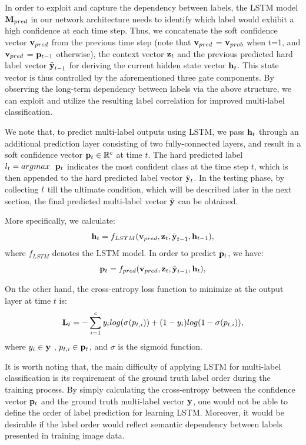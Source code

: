 \documentclass[letterpaper]{article} %
\begin{document}
In order to exploit and capture the dependency between labels, the LSTM model $\mathbf{M}_{pred}$ in our network architecture needs to identify which label would exhibit a high confidence at each time step. Thus, we concatenate the soft confidence vector $\mathbf{v}_{pred}$ from the previous time step (note that $\mathbf{v}_{pred}$ = $\mathbf{v}_{prob}$ when t=1, and $\mathbf{v}_{pred}$ = $\mathbf{p}_{t-1}$ otherwise), the context vector $\mathbf{z}_t$ and the previous predicted hard label vector $\tilde{\textbf{y}}_{t-1}$ for deriving the current hidden state vector $\mathbf{h}_t$. This state vector is thus controlled by the aforementioned three gate components. By observing the long-term dependency between labels via the above structure, we can exploit and utilize the resulting label correlation for improved multi-label classification.

We note that, to predict multi-label outputs using LSTM, we pass $\mathbf{h}_t$ through an additional prediction layer consisting of two fully-connected layers, and result in a soft confidence vector $\mathbf{p}_t \in \mathbb{R}^c$ at time $t$. The hard predicted label $l_t = argmax~~\mathbf{p}_t$ indicates the most confident class at the time step $t$, which is then appended to the hard predicted label vector $\tilde{\textbf{y}}_t$. In the testing phase, by collecting $l$ till the ultimate condition, which will be described later in the next section, the final predicted multi-label vector $\tilde{\textbf{y}}$ can be obtained.

More specifically, we calculate:
\begin{equation}
\label{eq:hidden}
\mathbf{h}_t = f_{LSTM}(\mathbf{v}_{pred}, \mathbf{z}_t, \tilde{\textbf{y}}_{t-1}, \mathbf{h}_{t-1}),
\end{equation}
where $f_{LSTM}$ denotes the LSTM model. In order to predict $\mathbf{p}_t$, we have:
\begin{equation}
\label{eq:prob}
\mathbf{p}_t = f_{pred}(\mathbf{v}_{pred}, \mathbf{z}_t, \tilde{\textbf{y}}_{t-1}, \mathbf{h}_t),
\end{equation}


On the other hand, the cross-entropy loss function to minimize at the output layer at time $t$ is:
\begin{equation}
\label{eq:loss}
\mathbf{L}_t = -\sum^{c}_{i=1} y_i log(\sigma(p_{t,i})) + (1 - y_i)log(1 - \sigma(p_{t,i})),
\end{equation}
where $y_i \in \textbf{y}$ , $p_{t,i} \in \mathbf{p}_t$, and $\sigma$ is the sigmoid function.

It is worth noting that, the main difficulty of applying LSTM for multi-label classification is its requirement of the ground truth label order during the training process. By simply calculating the cross-entropy between the confidence vector $\mathbf{p}_t$ and the ground truth multi-label vector $\textbf{y}$, one would not be able to define the order of label prediction for learning LSTM. Moreover, it would be desirable if the label order would reflect semantic dependency between labels presented in training image data.
\end{document}
